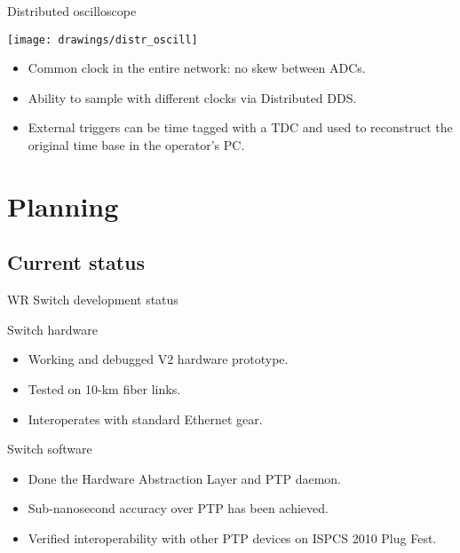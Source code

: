 \documentclass[compress,red]{beamer}
\begin{document}
\begin{frame}{Distributed oscilloscope}
  \begin{center}
    \texttt{[image: drawings/distr\_oscill]}
    \end{center}
    \begin{block}{}
      \begin{itemize}
      \item Common clock in the entire network: no skew between ADCs.
      \item Ability to sample with different clocks via Distributed DDS.
      \item External triggers can be time tagged with a TDC and used to reconstruct the original time base in the operator's PC.
      \end{itemize}
    \end{block}
\end{frame}



\section{Planning}

\subsection{Current status}

\begin{frame}{WR Switch development status}
	\begin{block}{Switch hardware}
          \begin{itemize}
            \item Working and debugged V2 hardware prototype.
            \item Tested on 10-km fiber links.
            \item Interoperates with standard Ethernet gear.
            \end{itemize}
            \end{block}

	\begin{block}{Switch software}
          \begin{itemize}
            \item Done the Hardware Abstraction Layer and PTP daemon. 
            \item Sub-nanosecond accuracy over PTP has been achieved.
            \item Verified interoperability with other PTP devices on ISPCS 2010 Plug Fest.
            \end{itemize}
          \end{block}
\end{frame}
\end{document}
